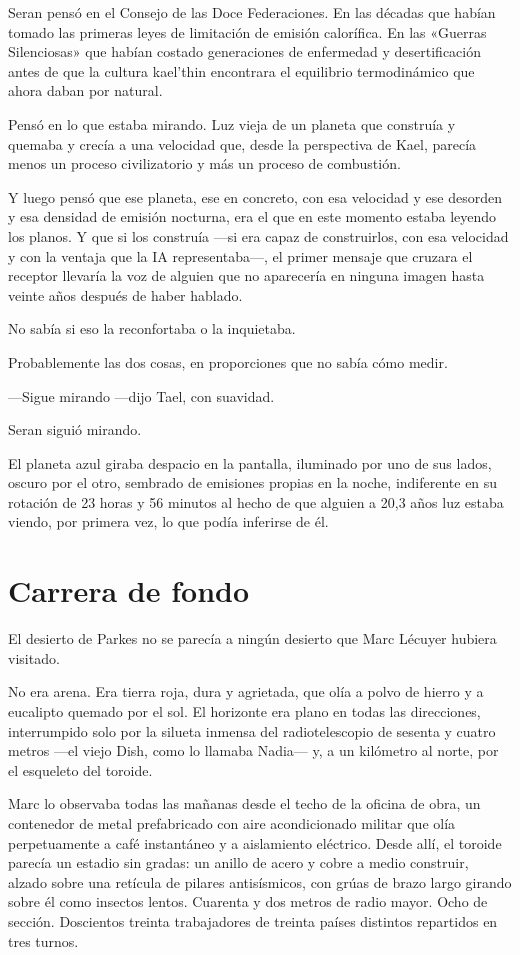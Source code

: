 \documentclass[11pt,a5paper,twoside]{book}
\begin{document}
Seran pensó en el Consejo de las Doce Federaciones. En las décadas que habían tomado las primeras leyes de limitación de emisión calorífica. En las «Guerras Silenciosas» que habían costado generaciones de enfermedad y desertificación antes de que la cultura kael'thin encontrara el equilibrio termodinámico que ahora daban por natural.

Pensó en lo que estaba mirando. Luz vieja de un planeta que construía y quemaba y crecía a una velocidad que, desde la perspectiva de Kael, parecía menos un proceso civilizatorio y más un proceso de combustión.

Y luego pensó que ese planeta, ese en concreto, con esa velocidad y ese desorden y esa densidad de emisión nocturna, era el que en este momento estaba leyendo los planos. Y que si los construía —si era capaz de construirlos, con esa velocidad y con la ventaja que la IA representaba—, el primer mensaje que cruzara el receptor llevaría la voz de alguien que no aparecería en ninguna imagen hasta veinte años después de haber hablado.

No sabía si eso la reconfortaba o la inquietaba.

Probablemente las dos cosas, en proporciones que no sabía cómo medir.

—Sigue mirando —dijo Tael, con suavidad.

Seran siguió mirando.

El planeta azul giraba despacio en la pantalla, iluminado por uno de sus lados, oscuro por el otro, sembrado de emisiones propias en la noche, indiferente en su rotación de 23 horas y 56 minutos al hecho de que alguien a 20,3 años luz estaba viendo, por primera vez, lo que podía inferirse de él.

\chapter{Carrera de fondo}

El desierto de Parkes no se parecía a ningún desierto que Marc Lécuyer hubiera visitado.

No era arena. Era tierra roja, dura y agrietada, que olía a polvo de hierro y a eucalipto quemado por el sol. El horizonte era plano en todas las direcciones, interrumpido solo por la silueta inmensa del radiotelescopio de sesenta y cuatro metros —el viejo Dish, como lo llamaba Nadia— y, a un kilómetro al norte, por el esqueleto del toroide.

Marc lo observaba todas las mañanas desde el techo de la oficina de obra, un contenedor de metal prefabricado con aire acondicionado militar que olía perpetuamente a café instantáneo y a aislamiento eléctrico. Desde allí, el toroide parecía un estadio sin gradas: un anillo de acero y cobre a medio construir, alzado sobre una retícula de pilares antisísmicos, con grúas de brazo largo girando sobre él como insectos lentos. Cuarenta y dos metros de radio mayor. Ocho de sección. Doscientos treinta trabajadores de treinta países distintos repartidos en tres turnos.
\end{document}
